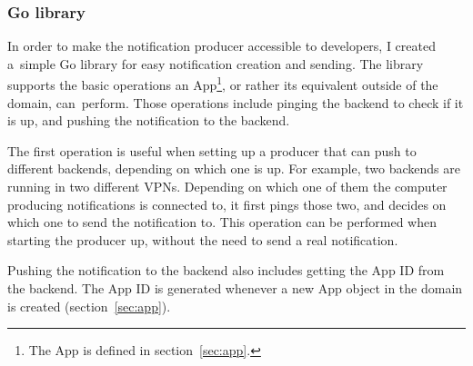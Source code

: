 \subsubsection{Go library}\label{sec:producer-go-library}

In order to make the notification producer
accessible to developers,
I created a~simple Go library
for easy notification creation and sending.
The library supports the basic operations
an App\footnote{
  The App is defined in section~\ref{sec:app}.
}, or rather its equivalent outside of the domain,
can~perform.
Those operations include pinging
the backend to check if it is up,
and pushing the notification to the backend.

The first operation is useful when setting up
a producer that can push to different backends,
depending on which one is up.
For example,
two backends are running
in two different VPNs.
Depending on which one of them
the computer producing notifications
is connected to,
it first pings those two,
and decides on which one to send the notification to.
This operation can be performed
when starting the producer up,
without the need to send a real notification.

Pushing the notification to the backend
also includes getting the App \ac{ID} from the backend.
The App \ac{ID} is generated whenever
a new App object in the domain is created
(section~\ref{sec:app}).
